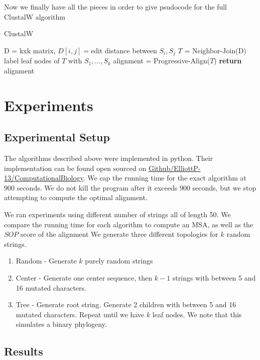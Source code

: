 \documentclass[11pt]{article}
\begin{document}
Now we finally have all the pieces in order to give psudocode for the full ClustalW algorithm

\begin{algorithm}[H]
    \caption{ClustalW}
    \label{alg:nj}
    \begin{algorithmic}[1]
        \State D = kxk matrix, $D[i,j] = $edit distance between $S_i, S_j$
        \State $T$ = Neighbor-Join(D)
        \State label leaf nodes of $T$ with $S_1, \dots, S_k$
        \State alignment = Progressive-Align($T$)
        \State \textbf{return} alignment
    \EndFunction
    \end{algorithmic}
\end{algorithm}

\section{Experiments}
\subsection{Experimental Setup}
The algorithms described above were implemented in python.
Their implementation can be found open sourced on 
\href{https://github.com/ElliottP-13/ComputationalBiology/tree/main/Project}{Github/ElliottP-13/ComputationalBiology}.
We cap the running time for the exact algorithm at 900 seconds. 
We do not kill the program after it exceeds 900 seconds, 
but we stop attempting to compute the optimal alignment.

We ran experiments using different number of strings all of length 50. 
We compare the running time for each algorithm to compute an MSA, as well as the $SOP$ score of the alignment
We generate three different topologies for $k$ random strings.

\begin{enumerate}
    \item Random - Generate $k$ purely random strings
    \item Center - Generate one center sequence, then $k-1$ strings with between 5 and 16 mutated characters.
    \item Tree - Generate root string. Generate 2 children with between 5 and 16 mutated characters. 
    Repeat until we have $k$ leaf nodes.
    We note that this simulates a binary phylogeny.
\end{enumerate}

\subsection{Results}


\nocite{*}
\singlespacing


\end{document}
